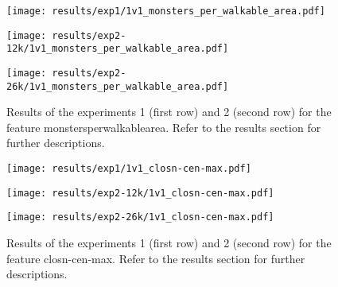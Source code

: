  
\begin{figure}[h!]
    \centering
	\begin{minipage}{0.3\linewidth}
		\texttt{[image: results/exp1/1v1\_monsters\_per\_walkable\_area.pdf]}
	\end{minipage}

	\begin{minipage}{0.3\linewidth}
		\texttt{[image: results/exp2-12k/1v1\_monsters\_per\_walkable\_area.pdf]}
	\end{minipage}
	\begin{minipage}{0.3\linewidth}
		\texttt{[image: results/exp2-26k/1v1\_monsters\_per\_walkable\_area.pdf]}
	\end{minipage}

	\caption[ Results: Feature monsters\textunderscore per\textunderscore walkable\textunderscore area]{ Results of the experiments 1 (first row) and 2 (second row) for the feature monsters\textunderscore per\textunderscore walkable\textunderscore area. Refer to the results section for further descriptions. }
	\label{fig:appendix_monsters_per_walkable_area}
\end{figure}
 
\begin{figure}[h!]
    \centering
	\begin{minipage}{0.3\linewidth}
		\texttt{[image: results/exp1/1v1\_closn-cen-max.pdf]}
	\end{minipage}

	\begin{minipage}{0.3\linewidth}
		\texttt{[image: results/exp2-12k/1v1\_closn-cen-max.pdf]}
	\end{minipage}
	\begin{minipage}{0.3\linewidth}
		\texttt{[image: results/exp2-26k/1v1\_closn-cen-max.pdf]}
	\end{minipage}

	\caption[ Results: Feature closn-cen-max]{ Results of the experiments 1 (first row) and 2 (second row) for the feature closn-cen-max. Refer to the results section for further descriptions. }
	\label{fig:appendix_closn-cen-max}
\end{figure}
 \newpage 

